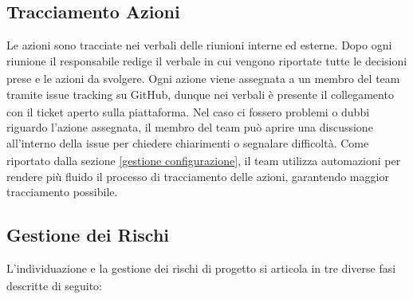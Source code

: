 \documentclass[a4paper,11pt]{article}
\newcommand{\G}{\textsubscript{\scalebox{0.6}{\textbf{G}}}}
\begin{document}
\subsection{Tracciamento Azioni}
Le azioni sono tracciate nei verbali delle riunioni interne ed esterne.
Dopo ogni riunione il responsabile\G{} redige il verbale\G{} in cui vengono riportate tutte le decisioni 
prese e le azioni da svolgere.
Ogni azione viene assegnata a un membro del team tramite issue\G{} tracking su GitHub\G{}, dunque nei verbali è presente
il collegamento con il ticket aperto sulla piattaforma.
Nel caso ci fossero problemi o dubbi riguardo l'azione assegnata, il membro del team può aprire una discussione
all'interno della issue\G{} per chiedere chiarimenti o segnalare difficoltà.
Come riportato dalla sezione \ref{gestione configurazione}, il team utilizza automazioni per rendere
più fluido il processo di tracciamento delle azioni, garantendo maggior tracciamento possibile.

\subsection{Gestione dei Rischi}
L'individuazione e la gestione dei rischi\G{} di progetto\G{} si articola in tre diverse fasi descritte di seguito:
\end{document}
